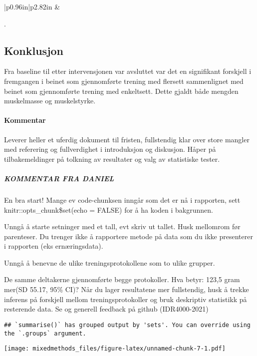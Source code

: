 \documentclass[
]{article}
\begin{document}
\begin{longtable}[c]{|p{0.96in}|p{2.82in}}
 &  \\

\noalign{\global\setlength{\arrayrulewidth}{2pt}}



\end{longtable}

.

\hypertarget{konklusjon}{%
\subsection{Konklusjon}\label{konklusjon}}

Fra baseline til etter intervensjonen var avsluttet var det en
signifikant forskjell i fremgangen i beinet som gjennomførte trening med
flersett sammenlignet med beinet som gjennomførte trening med
enkeltsett. Dette gjaldt både mengden muskelmasse og muskelstyrke.

\hypertarget{kommentar}{%
\paragraph{Kommentar}\label{kommentar}}

Leverer heller et uferdig dokument til fristen, fullstendig klar over
store mangler med referering og fullverdighet i introduksjon og
diskusjon. Håper på tilbakemeldinger på tolkning av resultater og valg
av statistiske tester.

\hypertarget{kommentar-fra-daniel}{%
\subparagraph{KOMMENTAR FRA DANIEL}\label{kommentar-fra-daniel}}

En bra start! Mange ev code-chunksen inngår som det er nå i rapporten,
sett knitr::opts\_chunk\$set(echo = FALSE) for å ha koden i bakgrunnen.

Unngå å starte setninger med et tall, evt skriv ut tallet. Husk
mellomrom før parenteser. Du trenger ikke å rapportere metode på data
som du ikke presenterer i rapporten (eks ernæringsdata).

Unngå å benevne de ulike treningsprotokollene som to ulike grupper.

De samme deltakerne gjennomførte begge protokoller. Hva betyr: 123,5
gram mer(SD 55.17, 95\% CI)? Når du lager resultatene mer fullstendig,
husk å trekke inferens på forskjell mellom treningsprotokoller og bruk
deskriptiv statistikk på resterende data. Se og generell feedback på
github (IDR4000-2021)

\begin{verbatim}
## `summarise()` has grouped output by 'sets'. You can override using the `.groups` argument.
\end{verbatim}

\texttt{[image: mixedmethods\_files/figure-latex/unnamed-chunk-7-1.pdf]}
\end{document}
